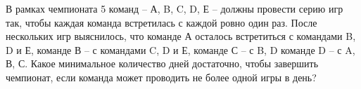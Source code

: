 \question
В рамках чемпионата 5 команд – А, B, C, D, Е – должны провести
серию игр так, чтобы каждая команда встретилась с каждой ровно один раз. После нескольких игр выяснилось, что команде А осталось встретиться с командами  B, D и Е, команде В – с командами  C, D и Е, команде С – с  B, D команде D – с A, В, С. Какое минимальное количество дней достаточно, чтобы завершить чемпионат, если команда может проводить не более одной игры в день?
